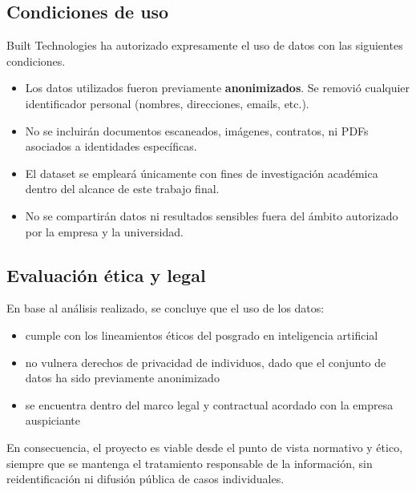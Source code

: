 \documentclass[
11pt, %
]{charter}
\begin{document}
\subsection*{Condiciones de uso}

Built Technologies ha autorizado expresamente el uso de datos con las siguientes condiciones.

\begin{itemize}
    \item Los datos utilizados fueron previamente \textbf{anonimizados}. Se removió cualquier identificador personal (nombres, direcciones, emails, etc.).
    \item No se incluirán documentos escaneados, imágenes, contratos, ni PDFs asociados a identidades específicas.
    \item El dataset se empleará únicamente con fines de investigación académica dentro del alcance de este trabajo final.
    \item No se compartirán datos ni resultados sensibles fuera del ámbito autorizado por la empresa y la universidad.
\end{itemize}

\subsection*{Evaluación ética y legal}

En base al análisis realizado, se concluye que el uso de los datos:

\begin{itemize}
    \item cumple con los lineamientos éticos del posgrado en inteligencia artificial
    \item no vulnera derechos de privacidad de individuos, dado que el conjunto de datos ha sido previamente anonimizado
    \item se encuentra dentro del marco legal y contractual acordado con la empresa auspiciante
\end{itemize}

En consecuencia, el proyecto es viable desde el punto de vista normativo y ético, siempre que se mantenga el tratamiento responsable de la información, sin reidentificación ni difusión pública de casos individuales.

\end{document}
